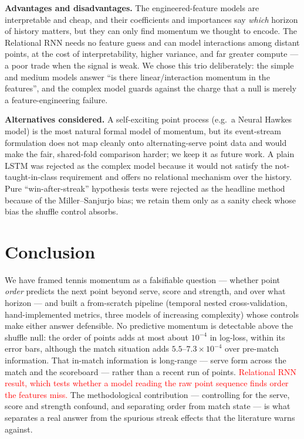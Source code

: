 \documentclass[10pt,a4paper]{article}
\newcommand{\ph}[1]{\textcolor{red}{#1}}
\begin{document}
\textbf{Advantages and disadvantages.} The engineered-feature models are
interpretable and cheap, and their coefficients and importances say \emph{which}
horizon of history matters, but they can only find momentum we thought to encode.
The Relational RNN needs no feature guess and can model interactions among
distant points, at the cost of interpretability, higher variance, and far greater
compute --- a poor trade when the signal is weak. We chose this trio deliberately:
the simple and medium models answer ``is there linear/interaction momentum in the
features'', and the complex model guards against the charge that a null is merely
a feature-engineering failure.

\textbf{Alternatives considered.} A self-exciting point process (e.g.\ a Neural
Hawkes model) is the most natural formal model of momentum, but its event-stream
formulation does not map cleanly onto alternating-serve point data and would make
the fair, shared-fold comparison harder; we keep it as future work. A plain LSTM
was rejected as the complex model because it would not satisfy the
not-taught-in-class requirement and offers no relational mechanism over the
history. Pure ``win-after-streak'' hypothesis tests were rejected as the headline
method because of the Miller--Sanjurjo bias; we retain them only as a sanity check
whose bias the shuffle control absorbs.

\section{Conclusion}
We have framed tennis momentum as a falsifiable question --- whether point
\emph{order} predicts the next point beyond serve, score and strength, and over
what horizon --- and built a from-scratch pipeline (temporal nested
cross-validation, hand-implemented metrics, three models of increasing
complexity) whose controls make either answer defensible. No predictive
momentum is detectable above the shuffle null: the order of points adds at most
about $10^{-4}$ in log-loss, within its error bars, although the match situation
adds $5.5$--$7.3\times10^{-4}$ over pre-match information. That in-match
information is long-range --- serve form across the match and the scoreboard ---
rather than a recent run of points. \ph{Relational RNN result, which tests
whether a model reading the raw point sequence finds order the features miss.}
The methodological
contribution --- controlling for the serve, score and strength confound, and
separating order from match state --- is what separates a real answer from the
spurious streak effects that the literature warns against.
\end{document}
